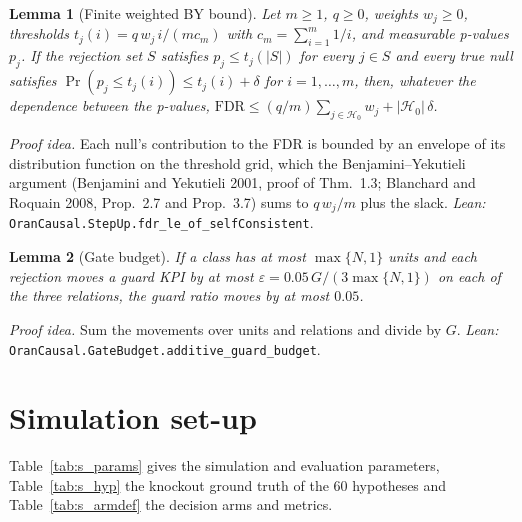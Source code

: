 \documentclass[pdflatex,sn-mathphys-num]{sn-jnl}%
\theoremstyle{thmstyleone}%
\newtheorem{lemma}{Lemma}%
\theoremstyle{thmstyletwo}%
\theoremstyle{thmstylethree}%
\begin{document}
\begin{lemma}[Finite weighted BY bound]
\label{lem:s_by}
Let $m \ge 1$, $q \ge 0$, weights $w_j \ge 0$, thresholds $t_j(i) = q\, w_j\, i / (m c_m)$ with $c_m = \sum_{i=1}^m 1/i$,
and measurable p-values $p_j$. If the rejection set $S$ satisfies $p_j \le t_j(|S|)$ for every $j \in S$ and every true
null satisfies $\Pr(p_j \le t_j(i)) \le t_j(i) + \delta$ for $i = 1, \dots, m$, then, whatever the dependence between
the p-values, $\mathrm{FDR} \le (q/m) \sum_{j \in \mathcal{H}_0} w_j + |\mathcal{H}_0|\, \delta$.
\end{lemma}
\noindent\emph{Proof idea.} Each null's contribution to the FDR is bounded by an envelope of its distribution function
on the threshold grid, which the Benjamini--Yekutieli argument (Benjamini and Yekutieli 2001, proof of Thm.~1.3; Blanchard and Roquain
2008, Prop.~2.7 and Prop.~3.7) sums to $q\, w_j / m$ plus the slack.
\emph{Lean:} \texttt{OranCausal.StepUp.fdr\_le\_of\_selfConsistent}.

\begin{lemma}[Gate budget]
\label{lem:s_gate}
If a class has at most $\max\{N, 1\}$ units and each rejection moves a guard KPI by at most
$\varepsilon = 0.05\, G / (3 \max\{N, 1\})$ on each of the three relations, the guard ratio moves by at most $0.05$.
\end{lemma}
\noindent\emph{Proof idea.} Sum the movements over units and relations and divide by $G$.
\emph{Lean:} \texttt{OranCausal.GateBudget.additive\_guard\_budget}.

\FloatBarrier
\section{Simulation set-up}
\label{esm:setup}

Table~\ref{tab:s_params} gives the simulation and evaluation parameters, Table~\ref{tab:s_hyp} the knockout ground truth of the 60 hypotheses and Table~\ref{tab:s_armdef} the decision arms and metrics.
\end{document}
